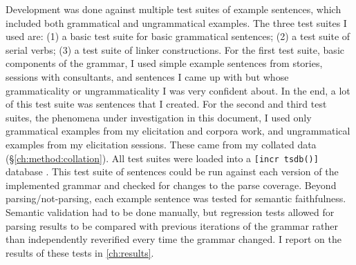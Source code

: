 
Development was done against multiple test suites of example sentences, which included both grammatical and ungrammatical examples. The three test suites I used are: (1) a basic test suite for basic grammatical sentences; (2) a test suite of serial verbs; (3) a test suite of linker constructions. For the first test suite, basic components of the grammar, I used simple example sentences from stories, sessions with consultants, and sentences I came up with but whose grammaticality or ungrammaticality I was very confident about. In the end, a lot of this test suite was sentences that I created. For the second and third test suites, the phenomena under investigation in this document, I used only grammatical examples from my elicitation and corpora work, and ungrammatical examples from my elicitation sessions. These came from my collated data (\S\ref{ch:method:collation}).  All test suites were loaded into a \texttt{[incr tsdb()]} database \citep{oepen2001}. This test suite of sentences could be run against each version of the implemented grammar and checked for changes to the parse coverage. Beyond parsing/not-parsing, each example sentence was tested for semantic faithfulness. Semantic validation had to be done manually, but regression tests allowed for parsing results to be compared with previous iterations of the grammar rather than independently reverified every time the grammar changed. I report on the results of these tests in \cref{ch:results}.

